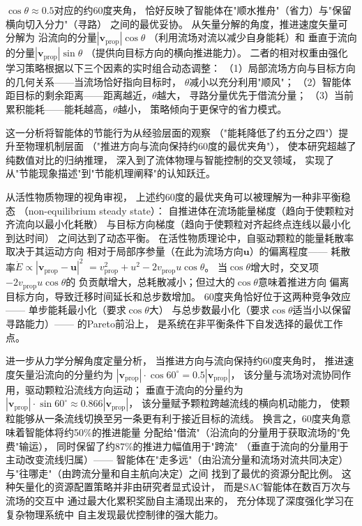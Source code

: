 $\cos\theta \approx 0.5$对应的约60度夹角，
恰好反映了智能体在"顺水推舟"（省力）与"保留横向切入分力"（寻路）
之间的最优妥协。
从矢量分解的角度，推进速度矢量可分解为
沿流向的分量$|\mathbf{v}_{\text{prop}}|\cos\theta$
（利用流场对流以减少自身能耗）和
垂直于流向的分量$|\mathbf{v}_{\text{prop}}|\sin\theta$
（提供向目标方向的横向推进能力）。
二者的相对权重由强化学习策略根据以下三个因素的实时组合动态调整：
（1）局部流场方向与目标方向的几何关系——当流场恰好指向目标时，
$\theta$减小以充分利用"顺风"；
（2）智能体距目标的剩余距离——距离越近，$\theta$越大，
寻路分量优先于借流分量；
（3）当前累积能耗——能耗越高，$\theta$越小，
策略倾向于更保守的省力模式。

这一分析将智能体的节能行为从经验层面的观察
（"能耗降低了约五分之四"）提升至物理机制层面
（"推进方向与流向保持约60度的最优夹角"），
使本研究超越了纯数值对比的归纳推理，
深入到了流体物理与智能控制的交叉领域，
实现了从"节能现象描述"到"节能机理阐释"的认知跃迁。

从活性物质物理的视角审视，
上述约60度的最优夹角可以被理解为一种非平衡稳态
（non-equilibrium steady state）：
自推进体在流场能量梯度（趋向于使颗粒对齐流向以最小化耗散）
与目标方向梯度（趋向于使颗粒对齐起终点连线以最小化到达时间）
之间达到了动态平衡。
在活性物质理论中，自驱动颗粒的能量耗散率取决于其运动方向
相对于局部序参量（在此为流场方向$\mathbf{u}$）的偏离程度——
耗散率$\dot{E} \propto |\mathbf{v}_{\text{prop}} - \mathbf{u}|^2$
$= v_{\text{prop}}^2 + u^2 - 2 v_{\text{prop}} u \cos\theta$。
当$\cos\theta$增大时，交叉项$-2 v_{\text{prop}} u \cos\theta$的
负贡献增大，总耗散减小；但过大的$\cos\theta$意味着推进方向
偏离目标方向，导致迁移时间延长和总步数增加。
60度夹角恰好位于这两种竞争效应——
单步能耗最小化（要求$\cos\theta$大）
与总步数最小化（要求$\cos\theta$适当小以保留寻路能力）——
的Pareto前沿上，
是系统在非平衡条件下自发选择的最优工作点。

进一步从力学分解角度定量分析，
当推进方向与流向保持约60度夹角时，
推进速度矢量沿流向的分量约为
$|\mathbf{v}_{\text{prop}}| \cdot \cos 60^\circ = 0.5|\mathbf{v}_{\text{prop}}|$，
该分量与流场对流协同作用，驱动颗粒沿流线方向运动；
垂直于流向的分量约为
$|\mathbf{v}_{\text{prop}}| \cdot \sin 60^\circ \approx 0.866|\mathbf{v}_{\text{prop}}|$，
该分量赋予颗粒跨越流线的横向机动能力，
使颗粒能够从一条流线切换至另一条更有利于接近目标的流线。
换言之，60度夹角意味着智能体将约50\%的推进能量
分配给"借流"（沿流向的分量用于获取流场的"免费"输运），
同时保留了约87\%的推进力幅值用于"跨流"
（垂直于流向的分量用于主动改变流线归属）——
智能体在"走多远"（由沿流分量和流场对流共同决定）
与"往哪走"（由跨流分量和自主航向决定）之间
找到了最优的资源分配比例。
这种矢量化的资源配置策略并非由研究者显式设计，
而是SAC智能体在数百万次与流场的交互中
通过最大化累积奖励自主涌现出来的，
充分体现了深度强化学习在复杂物理系统中
自主发现最优控制律的强大能力。

